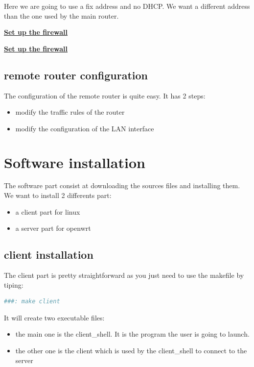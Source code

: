 Here we are going to use a fix address and no DHCP. We want a different address than the one used by the main router.





\hfill \break \underline{\textbf{Set up the firewall}}



\hfill \break \underline{\textbf{Set up the firewall}}


\subsection{remote router configuration}

The configuration of the remote router is quite easy. It has 2 steps:
\begin{itemize}
	\item modify the traffic rules of the router
	\item modify the configuration of the LAN interface
\end{itemize}

\section{Software installation}

The software part consist at downloading the sources files and installing them. We want to install 2 differents part:
\begin{itemize}
	\item a client part for linux
	\item a server part for openwrt
\end{itemize}

\subsection{client installation}

The client part is pretty straightforward as you just need to use the makefile by tiping:
\begin{lstlisting}[language=bash]
	###: make client
\end{lstlisting}
It will create two executable files: 
\begin{itemize}
	\item the main one is the client\_shell. It is the program the user is going to launch.
	\item the other one is the client which is used by the client\_shell to connect to the server
\end{itemize}


